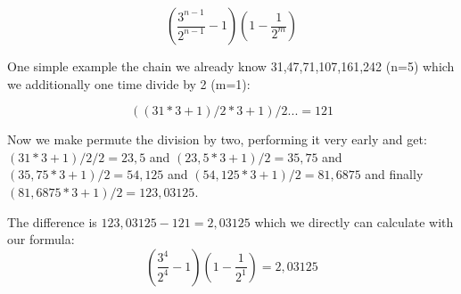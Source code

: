 \[
\left(\frac{3^{n-1}}{2^{n-1}}-1\right)\left(1-\frac{1}{2^m}\right)
\]

One simple example the chain we already know 31,47,71,107,161,242 (n=5) which we additionally one time divide by 2 (m=1):

\[
((31*3+1)/2*3+1)/2...=121
\]

Now we make permute the division by two, performing it very early and get: $(31*3+1)/2/2=23,5$ and $(23,5*3+1)/2=35,75$ and $(35,75*3+1)/2=54,125$ and $(54,125*3+1)/2=81,6875$ and finally $(81,6875*3+1)/2=123,03125$.

The difference is $123,03125-121=2,03125$ which we directly can calculate with our formula:
\[
\left(\frac{3^4}{2^4}-1\right)\left(1-\frac{1}{2^1}\right)=2,03125
\]
